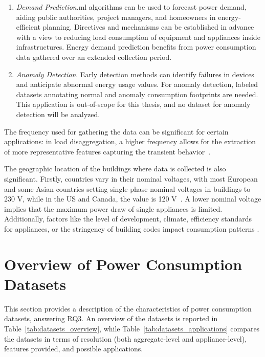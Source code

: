 \begin{enumerate}[label={\textit{A\arabic*.}}, leftmargin=3.5em]
    \item \textit{Demand Prediction}.\@ \acrshort{ml} algorithms can be used to forecast power demand, aiding public authorities, project managers, and homeowners in energy-efficient planning. Directives and mechanisms can be established in advance with a view to reducing load consumption of equipment and appliances inside infrastructures. Energy demand prediction benefits from power consumption data gathered over an extended collection period.

    \item \textit{Anomaly Detection}. Early detection methods can identify failures in devices and anticipate abnormal energy usage values. For anomaly detection, labeled datasets annotating normal and anomaly consumption footprints are needed. This application is out-of-scope for this thesis, and no dataset for anomaly detection will be analyzed.
\end{enumerate}

The frequency used for gathering the data can be significant for certain applications: in load disaggregation, a higher frequency allows for the extraction of more representative features capturing the transient behavior~\parencite{carriearmelDisaggregationHolyGrail2013}.

The geographic location of the buildings where data is collected is also significant. Firstly, countries vary in their nominal voltages, with most European and some Asian countries setting single-phase nominal voltages in buildings to 230 V, while in the US and Canada, the value is 120 V~\parencite{leeComparisonAnalysisVoltage2017, internationalelectrotechnicalcommissionWorldPlugs2024}. A lower nominal voltage implies that the maximum power draw of single appliances is limited. Additionally, factors like the level of development, climate, efficiency standards for appliances, or the stringency of building codes impact consumption patterns \parencite{berardiCrosscountryComparisonBuilding2017}.

\newpage

\section{Overview of Power Consumption Datasets}

This section provides a description of the characteristics of power consumption datasets, answering RQ3. An overview of the datasets is reported in Table~\ref{tab:datasets_overview}, while Table~\ref{tab:datasets_applications} compares the datasets in terms of resolution (both aggregate-level and appliance-level), features provided, and possible applications.

